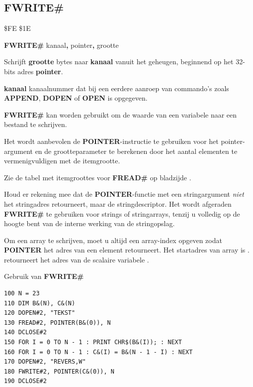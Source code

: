 \subsection{FWRITE\#}
\begin{description}[leftmargin=2cm,style=nextline]
\item [Token:]    \$FE \$1E

\item [Formaat:]   {\bf FWRITE\#} kanaal{\bf,} pointer{\bf,} grootte

\item [Gebruik:]    Schrijft {\bf grootte} bytes naar {\bf kanaal} vanuit het geheugen, beginnend op het 32-bits adres {\bf pointer}.

{\bf kanaal} kanaalnummer dat bij een eerdere aanroep van commando's zoals {\bf APPEND}, {\bf DOPEN} of {\bf OPEN} is opgegeven.

                  {\bf FWRITE\#} kan worden gebruikt om de waarde van een variabele naar een bestand te schrijven.

                  Het wordt aanbevolen de {\bf POINTER}-instructie te gebruiken voor het pointer-argument en de grootteparameter te berekenen door het aantal elementen te vermenigvuldigen met de itemgrootte.

                  Zie de tabel met itemgroottes voor {\bf FREAD\#} op bladzijde \pageref{freadtable}.

\item [Opmerkingen:]  Houd er rekening mee dat de {\bf POINTER}-functie met een stringargument {\em niet} het stringadres retourneert, maar de stringdescriptor. Het wordt afgeraden {\bf FWRITE\#} te gebruiken voor strings of stringarrays, tenzij u volledig op de hoogte bent van de interne werking van de stringopslag.

                  Om een array te schrijven, moet u altijd een array-index opgeven zodat {\bf POINTER} het adres van een element retourneert. Het startadres van array  is .  retourneert het adres van de scalaire variabele .

\item [Voorbeeld:]  Gebruik van {\bf FWRITE\#}

\begin{tcolorbox}[colback=black,coltext=white]
\verbatimfont{\codefont}
\begin{verbatim}
100 N = 23
110 DIM B&(N), C&(N)
120 DOPEN#2, "TEKST"
130 FREAD#2, POINTER(B&(0)), N
140 DCLOSE#2
150 FOR I = 0 TO N - 1 : PRINT CHR$(B&(I)); : NEXT
160 FOR I = 0 TO N - 1 : C&(I) = B&(N - 1 - I) : NEXT
170 DOPEN#2, "REVERS,W"
180 FWRITE#2, POINTER(C&(0)), N
190 DCLOSE#2
\end{verbatim}
\end{tcolorbox}
\end{description}

